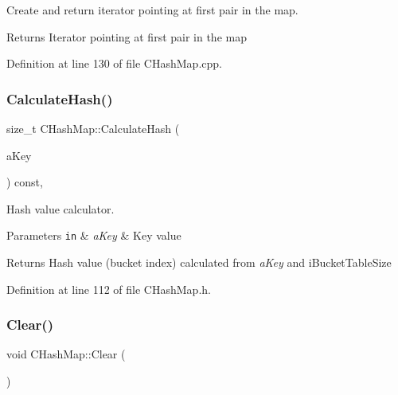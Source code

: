 Create and return iterator pointing at first pair in the map. 

\begin{DoxyReturn}{Returns}
Iterator pointing at first pair in the map 
\end{DoxyReturn}


Definition at line 130 of file C\+Hash\+Map.\+cpp.

\mbox{\label{class_c_hash_map_ad7230ba064063608b7e49495d3660426}} 
\subsubsection{\texorpdfstring{Calculate\+Hash()}{CalculateHash()}}
{\footnotesize\ttfamily size\+\_\+t C\+Hash\+Map\+::\+Calculate\+Hash (\begin{DoxyParamCaption}\item[{const \hyperlink{class_c_pair_a9030f3ef2a07301c105bdf17620ae66a}{C\+Pair\+::\+T\+Key} \&}]{a\+Key }\end{DoxyParamCaption}) const\hspace{0.3cm}{\ttfamily [inline]}, {\ttfamily [protected]}}



Hash value calculator. 


\begin{DoxyParams}[1]{Parameters}
\mbox{\tt in}  & {\em a\+Key} & Key value \\
\hline
\end{DoxyParams}
\begin{DoxyReturn}{Returns}
Hash value (bucket index) calculated from {\itshape a\+Key} and {\ttfamily i\+Bucket\+Table\+Size} 
\end{DoxyReturn}


Definition at line 112 of file C\+Hash\+Map.\+h.

\mbox{\label{class_c_hash_map_a5fa63d790d41e91a0c61d63e813356af}} 
\subsubsection{\texorpdfstring{Clear()}{Clear()}}
{\footnotesize\ttfamily void C\+Hash\+Map\+::\+Clear (\begin{DoxyParamCaption}{ }\end{DoxyParamCaption})}



